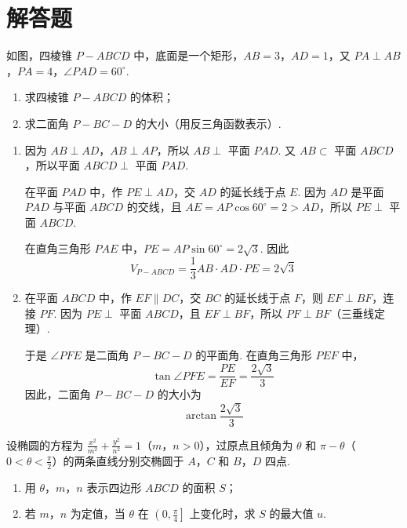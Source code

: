 \section{解答题}

\begin{problem}
如图，四棱锥 \(P-ABCD\) 中，底面是一个矩形，\(AB=3\)，\(AD=1\)，又 \(PA\perp AB\)，\(PA=4\)，\(\angle PAD=60^\circ\).

\begin{enumerate}
\item 求四棱锥 \(P-ABCD\) 的体积；
\item 求二面角 \(P-BC-D\) 的大小（用反三角函数表示）.
\end{enumerate}

\end{problem}

\begin{solution}
\begin{enumerate}
\item 因为 \(AB\perp AD\)，\(AB\perp AP\)，所以 \(AB\perp\) 平面 \(PAD\). 又 \(AB\subset\) 平面 \(ABCD\)，所以平面 \(ABCD\perp\) 平面 \(PAD\).

在平面 \(PAD\) 中，作 \(PE\perp AD\)，交 \(AD\) 的延长线于点 \(E\). 因为 \(AD\) 是平面 \(PAD\) 与平面 \(ABCD\) 的交线，且 \(AE=AP\cos60^\circ=2>AD\)，所以 \(PE\perp\) 平面 \(ABCD\).

在直角三角形 \(PAE\) 中，\(PE=AP\sin60^\circ=2\sqrt{3}\). 因此
\[
V_{P-ABCD}=\frac{1}{3}AB\cdot AD\cdot PE=2\sqrt{3}
\]

\item 在平面 \(ABCD\) 中，作 \(EF\parallel DC\)，交 \(BC\) 的延长线于点 \(F\)，则 \(EF\perp BF\)，连接 \(PF\). 因为 \(PE\perp\) 平面 \(ABCD\)，且 \(EF\perp BF\)，所以 \(PF\perp BF\)（三垂线定理）.

于是 \(\angle PFE\) 是二面角 \(P-BC-D\) 的平面角. 在直角三角形 \(PEF\) 中，
\[
\tan\angle PFE=\frac{PE}{EF}=\frac{2\sqrt{3}}{3}
\]
因此，二面角 \(P-BC-D\) 的大小为
\[
\arctan\frac{2\sqrt{3}}{3}
\]
\end{enumerate}
\end{solution}

\begin{problem}
设椭圆的方程为 \(\frac{x^2}{m^2}+\frac{y^2}{n^2}=1\)（\(m\)，\(n>0\)），过原点且倾角为 \(\theta\) 和 \(\pi-\theta\)（\(0<\theta<\frac{\pi}{2}\)）的两条直线分别交椭圆于 \(A\)，\(C\) 和 \(B\)，\(D\) 四点.

\begin{enumerate}
\item 用 \(\theta\)，\(m\)，\(n\) 表示四边形 \(ABCD\) 的面积 \(S\)；
\item 若 \(m\)，\(n\) 为定值，当 \(\theta\) 在 \(\left(0,\frac{\pi}{4}\right]\) 上变化时，求 \(S\) 的最大值 \(u\).
\end{enumerate}
\end{problem}

